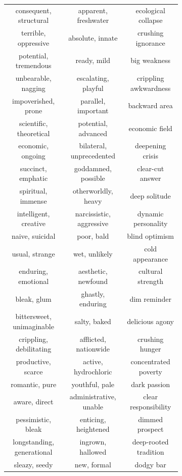 \documentclass[OpenMind]{stjour}
\begin{document}
\begin{figure}
\begin{subfigure}{0.3\textwidth}
\begin{center}
\begin{tabular}{ c | c | c  }
			\tiny consequent, structural & \tiny apparent, freshwater & \tiny ecological collapse\\
			\tiny terrible, oppressive & \tiny absolute, innate & \tiny crushing ignorance\\
			\tiny potential, tremendous & \tiny ready, mild & \tiny big weakness\\
			\tiny unbearable, nagging & \tiny escalating, playful & \tiny crippling awkwardness\\
			\tiny impoverished, prone & \tiny parallel, important & \tiny backward area\\
			\tiny scientific, theoretical & \tiny potential, advanced & \tiny economic field\\
			\tiny economic, ongoing & \tiny bilateral, unprecedented & \tiny deepening crisis\\
			\tiny succinct, emphatic & \tiny goddamned, possible & \tiny clear-cut answer\\
			\tiny spiritual, immense & \tiny otherworldly, heavy & \tiny deep solitude\\
			\tiny intelligent, creative & \tiny narcissistic, aggressive & \tiny dynamic personality\\
			\tiny naive, suicidal & \tiny poor, bald & \tiny blind optimism\\
			\tiny usual, strange & \tiny wet, unlikely & \tiny cold appearance\\
			\tiny enduring, emotional & \tiny aesthetic, newfound & \tiny cultural strength\\
			\tiny bleak, glum & \tiny ghastly, enduring & \tiny dim reminder\\
			\tiny bittersweet, unimaginable & \tiny salty, baked & \tiny delicious agony\\
			\tiny crippling, debilitating & \tiny afflicted, nationwide & \tiny crushing hunger\\
			\tiny productive, scarce & \tiny active, hydrochloric & \tiny concentrated poverty\\
			\tiny romantic, pure & \tiny youthful, pale & \tiny dark passion\\
			\tiny aware, direct & \tiny administrative, unable & \tiny clear responsibility\\
			\tiny pessimistic, bleak & \tiny enticing, heightened & \tiny dimmed prospect\\
			\tiny longstanding, generational & \tiny ingrown, hallowed & \tiny deep-rooted tradition\\
			\tiny sleazy, seedy & \tiny new, formal & \tiny dodgy bar\\

\end{tabular}
\end{center}
\end{subfigure}
\end{figure}
\end{document}
